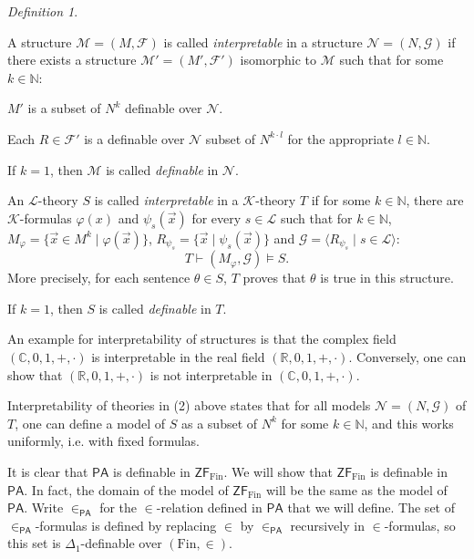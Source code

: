 \documentclass[a4paper, 11pt]{amsart}
\theoremstyle{remark}
\newtheorem{definition}[definition]{Definition}
\newcommand{\axiomft}[1]{\mathsf{#1}}
\newcommand{\PA}{\axiomft{PA}}
\newcommand{\ZF}{\axiomft{ZF}}
\newcommand{\NN}{\mathbb{N}}
\newcommand{\Fin}{\mathrm{Fin}}
\newcommand{\RR}{\mathbb{R}}
\newcommand{\CC}{\mathbb C}
\newcommand{\cF}{\mathcal F}
\newcommand{\cG}{\mathcal G}
\newcommand{\cL}{\mathcal L}
\newcommand{\cM}{\mathcal M}
\newcommand{\cN}{\mathcal N}
\newcommand{\cK}{\mathcal K}
\newenvironment{enumerate-(a)}{\begin{enumerate}[label={\upshape (\alph*)}, leftmargin=2pc]}{\end{enumerate}}
\newenvironment{enumerate-(1)}{\begin{enumerate}[label={\upshape (\arabic*)}, leftmargin=2pc]}{\end{enumerate}}
\begin{document}
\begin{definition} \ 
\begin{enumerate-(1)} 
\item 
A structure $\cM=(M,\cF)$ is called \emph{interpretable} in a structure  $\cN=(N,\cG)$ if there exists a structure $\cM'=(M',\cF')$ isomorphic to $\cM$ such that for some $k\in\NN$: 
\begin{enumerate-(a)} 
\item 
$M'$ is a subset of $N^k$ definable over $\cN$. 
\item 
Each $R\in \cF'$ is a definable over $\cN$ subset of $N^{k\cdot l}$ for the appropriate $l\in\NN$.  
\end{enumerate-(a)} 

If $k=1$, then $\cM$ is called \emph{definable} in $\cN$. 
\item 
An $\cL$-theory $S$ is  called \emph{interpretable} in a $\cK$-theory $T$ if for some $k\in\NN$, there are $\cK$-formulas $\varphi(x)$ and $\psi_s(\vec{x})$ for every $s\in \cL$ such that for $k\in\NN$, $M_\varphi=\{\vec{x}\in M^k \mid \varphi(\vec{x})\}$, $R_{\psi_s}=\{ \vec{x} \mid \psi_s(\vec{x})\}$ and $\cG=\langle R_{\psi_s} \mid s\in \cL\rangle$: 
$$T \vdash (M_\varphi, \cG)\models S.$$ 
More precisely, for each sentence $\theta\in S$, $T$ proves that $\theta$ is true in this structure. 

If $k=1$, then $S$ is called \emph{definable} in $T$. 
\end{enumerate-(1)} 
\end{definition} 

An example for interpretability of structures is that the complex field $(\CC,0,1,+,\cdot)$ is interpretable in the real field $(\RR,0,1,+,\cdot)$. 
Conversely, one can show that $(\RR,0,1,+,\cdot)$ is not interpretable in $(\CC,0,1,+,\cdot)$. 

Interpretability of theories in (2) above states that for all models $\cN=(N,\cG)$ of $T$, one can define a model of $S$ as a subset of $N^k$ for some $k\in \NN$, and this works uniformly, i.e. with fixed formulas. 

It is clear that $\PA$ is definable in $\ZF_\Fin$. 
We will show that $\ZF_\Fin$ is definable in $\PA$. 
In fact, the domain of the model of $\ZF_\Fin$ will be the same as the model of $\PA$. 
Write $\in_\PA$ for the $\in$-relation defined in $\PA$ that we will define. 
The set of $\in_\PA$-formulas is defined by replacing $\in$ by $\in_\PA$ recursively in $\in$-formulas, so this set is $\Delta_1$-definable over $(\Fin,\in)$. 
\end{document}
